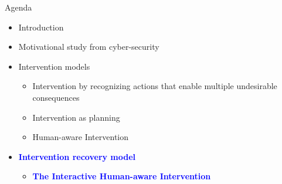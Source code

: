 \begin{frame}{Agenda}
\begin{itemize}
\item Introduction
\item Motivational study from cyber-security
\item Intervention models
\begin{itemize}
\item Intervention by recognizing actions that enable multiple undesirable consequences
\item Intervention as planning
\item Human-aware Intervention
\end{itemize}
\item \textcolor{blue} {\textbf{Intervention recovery model}}
\begin{itemize}
\item \textcolor{blue} {\textbf{The Interactive Human-aware Intervention}}
\end{itemize}
\end{itemize}

\end{frame}